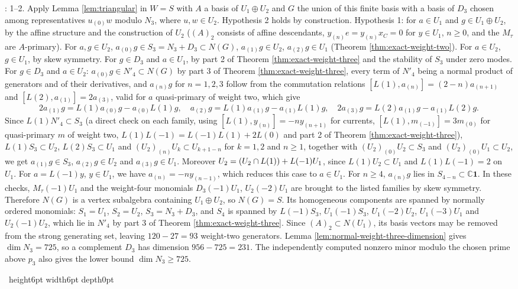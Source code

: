 \documentclass[leqno]{article}
\newcommand{\Cbb}{\ensuremath{\mathbb{C}}}
\renewcommand{\geq}{\ensuremath{\geqslant}}
\newcommand{\qed}{\hfill \vrule height6pt  width6pt depth0pt}
\let\ker\relax
\DeclareMathOperator{\ker}{Ker}
\newenvironment{proof}[1][]{\noindent {\it Proof #1} : }{\hbox{~}\qed
\smallskip
}
\numberwithin{equation}{section}
\begin{document}
\begin{proof}
1--2. Apply Lemma \ref{lem:triangular} in $W = S$ with $A$ a basis of $U_1 \oplus U_2$ and $G$ the union of this finite basis with a basis of $D_3$ chosen among representatives $u_{(0)}w$ modulo $N_3$, where $u,w \in U_2$. Hypothesis 2 holds by construction. Hypothesis 1: for $a \in U_1$ and $g \in U_1 \oplus U_2$, by the affine structure and the construction of $U_2$ ($(A)_2$ consists of affine descendants, $y_{(n)}e = y_{(n)}x_C = 0$ for $y \in U_1$, $n \geq 0$, and the $M_\tau$ are $A$-primary). For $a, g \in U_2$, $a_{(0)}g \in S_3 = N_3 + D_3 \subset N(G)$, $a_{(1)}g \in U_2$, $a_{(2)}g \in U_1$ (Theorem \ref{thm:exact-weight-two}). For $a \in U_2$, $g \in U_1$, by skew symmetry. For $g \in D_3$ and $a \in U_1$, by part 2 of Theorem \ref{thm:exact-weight-three} and the stability of $S_3$ under zero modes. For $g \in D_3$ and $a \in U_2$: $a_{(0)}g \in N'_4 \subset N(G)$ by part 3 of Theorem \ref{thm:exact-weight-three}, every term of $N'_4$ being a normal product of generators and of their derivatives, and $a_{(n)}g$ for $n = 1, 2, 3$ follow from the commutation relations $[L(1), a_{(n)}] = (2-n)a_{(n+1)}$ and $[L(2), a_{(1)}] = 2a_{(3)}$, valid for $a$ quasi-primary of weight two, which give
\[
2a_{(1)}g = L(1)a_{(0)}g - a_{(0)}L(1)g, \quad a_{(2)}g = L(1)a_{(1)}g - a_{(1)}L(1)g, \quad 2a_{(3)}g = L(2)a_{(1)}g - a_{(1)}L(2)g.
\]
Since $L(1)N'_4 \subset S_3$ (a direct check on each family, using $[L(1), y_{(n)}] = -n y_{(n+1)}$ for currents, $[L(1), m_{(-1)}] = 3m_{(0)}$ for quasi-primary $m$ of weight two, $L(1)L(-1) = L(-1)L(1) + 2L(0)$ and part 2 of Theorem \ref{thm:exact-weight-three}), $L(1)S_3 \subset U_2$, $L(2)S_3 \subset U_1$ and $(U_2)_{(n)}U_k \subset U_{k+1-n}$ for $k = 1,2$ and $n \geq 1$, together with $(U_2)_{(0)}U_2 \subset S_3$ and $(U_2)_{(0)}U_1 \subset U_2$, we get $a_{(1)}g \in S_3$, $a_{(2)}g \in U_2$ and $a_{(3)}g \in U_1$. Moreover $U_2 = (U_2 \cap \ker L(1)) + L(-1)U_1$, since $L(1)U_2 \subset U_1$ and $L(1)L(-1) = 2$ on $U_1$. For $a = L(-1)y$, $y \in U_1$, we have $a_{(n)} = -n y_{(n-1)}$, which reduces this case to $a \in U_1$. For $n \geq 4$, $a_{(n)}g$ lies in $S_{4-n} \subset \Cbb\mathbf 1$. In these checks, $M_\tau(-1)U_1$ and the weight-four monomials $D_3(-1)U_1$, $U_2(-2)U_1$ are brought to the listed families by skew symmetry. Therefore $N(G)$ is a vertex subalgebra containing $U_1 \oplus U_2$, so $N(G) = S$. Its homogeneous components are spanned by normally ordered monomials: $S_1 = U_1$, $S_2 = U_2$, $S_3 = N_3 + D_3$, and $S_4$ is spanned by $L(-1)S_3$, $U_1(-1)S_3$, $U_1(-2)U_2$, $U_1(-3)U_1$ and $U_2(-1)U_2$, which lie in $N'_4$ by part 3 of Theorem \ref{thm:exact-weight-three}. Since $(A)_2 \subset N(U_1)$, its basis vectors may be removed from the strong generating set, leaving $120-27 = 93$ weight-two generators. Lemma \ref{lem:normal-weight-three-dimension} gives $\dim N_3 = 725$, so a complement $D_3$ has dimension $956-725 = 231$. The independently computed nonzero minor modulo the chosen prime above $p_3$ also gives the lower bound $\dim N_3 \geq 725$.


\end{proof}
\end{document}
